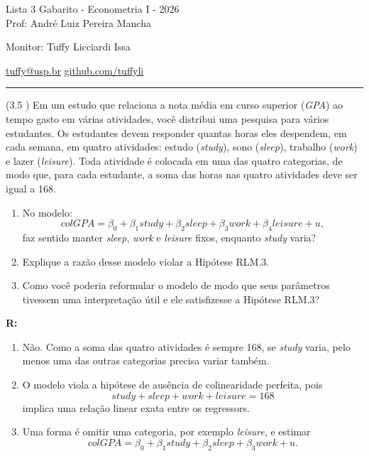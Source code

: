 \documentclass[12pt,letterpaper, onecolumn]{exam}
\renewenvironment{solution}
  {\par\noindent\textbf{R:}\enspace\color{blue}}
  {\par\color{black}}
\begin{document}
\begingroup
    \centering
    \LARGE Lista 3 Gabarito - Econometria I - 2026\\[0.5em]
    \large Prof: André Luiz Pereira Mancha \par
    \large Monitor: Tuffy Licciardi Issa \par
    \small \href{mailto:tuffy@usp.br}{tuffy@usp.br} \quad
    \href{https://github.com/Tuffyli}{github.com/tuffyli} \par
\endgroup
\rule{\textwidth}{0.4pt}
\pointsdroppedatright
\printanswers
\renewcommand{\solutiontitle}{\noindent\textbf{Ans:}\enspace}

\begin{questions}

   \question (3.5 \citep{wooldridge2016}) Em um estudo que relaciona a nota média em curso superior (\textit{GPA}) ao tempo gasto em várias atividades, você distribui uma pesquisa para vários estudantes. Os estudantes devem responder quantas horas eles despendem, em cada semana, em quatro atividades: estudo (\textit{study}), sono (\textit{sleep}), trabalho (\textit{work}) e lazer (\textit{leisure}). Toda atividade é colocada em uma das quatro categorias, de modo que, para cada estudante, a soma das horas nas quatro atividades deve ser igual a 168.
    \begin{enumerate}[label=(\alph*)]
    \item No modelo:\begin{equation*}
        colGPA = \beta_0 + \beta_1study +\beta_2sleep + \beta_3work + \beta_4 leisure + u,
    \end{equation*} faz sentido manter \textit{sleep}, \textit{work} e \textit{leisure} fixos, enquanto \textit{study} varia?
    \item Explique a razão desse modelo violar a Hipótese RLM.3.
    \item Como você poderia reformular o modelo de modo que seus parâmetros tivessem uma interpretação útil e ele satisfizesse a Hipótese RLM.3?
    \end{enumerate}

\begin{solution}
\begin{enumerate}[label=(\alph*)]
    \item Não. Como a soma das quatro atividades é sempre 168, se \textit{study} varia, pelo menos uma das outras categorias precisa variar também.
    \item O modelo viola a hipótese de ausência de colinearidade perfeita, pois
    \[
    study+sleep+work+leisure=168
    \]
    implica uma relação linear exata entre os regressors.
    \item Uma forma é omitir uma categoria, por exemplo \textit{leisure}, e estimar
    \[
    colGPA=\beta_0+\beta_1study+\beta_2sleep+\beta_3work+u.
    \]
\end{enumerate}
\end{solution}


\end{questions}
\end{document}
